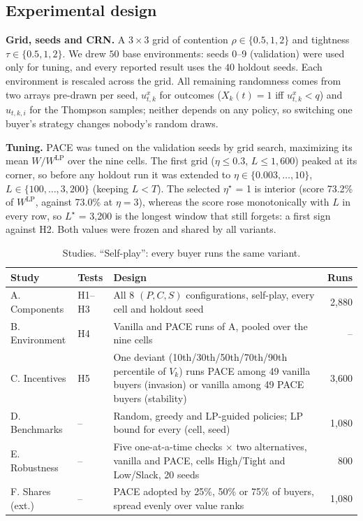 \documentclass{article}
\newcommand{\WLP}{W^{\mathrm{LP}}}
\begin{document}
\subsection{Experimental design}
\label{sec:design}
\textbf{Grid, seeds and CRN.} A $3\times3$ grid of contention $\rho\in\{0.5,1,2\}$ and tightness $\tau\in\{0.5,1,2\}$. We drew $50$ base environments: seeds 0--9 (validation) were used only for tuning, and every reported result uses the $40$ holdout seeds. Each environment is rescaled across the grid. All remaining randomness comes from two arrays pre-drawn per seed, $u^x_{t,k}$ for outcomes ($X_k(t)=1$ iff $u^x_{t,k}<q$) and $u_{t,k,i}$ for the Thompson samples; neither depends on any policy, so switching one buyer's strategy changes nobody's random draws.

\textbf{Tuning.} PACE was tuned on the validation seeds by grid search, maximizing its mean $W/\WLP$ over the nine cells. The first grid ($\eta\le0.3$, $L\le1{,}600$) peaked at its corner, so before any holdout run it was extended to $\eta\in\{0.003,\dots,10\}$, $L\in\{100,\dots,3{,}200\}$ (keeping $L<T$). The selected $\eta^\star$ = 1 is interior (score 73.2\% of $\WLP$, against 73.0\% at $\eta=3$), whereas the score rose monotonically with $L$ in every row, so $L^\star$ = 3,200 is the longest window that still forgets: a first sign against H2. Both values were frozen and shared by all variants.

\begin{table}[h]
\centering\small
\caption{Studies. ``Self-play'': every buyer runs the same variant.}
\label{tab:studies}
\begin{tabular}{@{}l l p{9.6cm} r@{}}
\toprule
\textbf{Study} & \textbf{Tests} & \textbf{Design} & \textbf{Runs}\\
\midrule
A. Components & H1--H3 & All 8 $(P,C,S)$ configurations, self-play, every cell and holdout seed & 2,880\\
B. Environment & H4 & Vanilla and PACE runs of A, pooled over the nine cells & --\\
C. Incentives & H5 & One deviant (10th/30th/50th/70th/90th percentile of $V_k$) runs PACE among 49 vanilla buyers (invasion) or vanilla among 49 PACE buyers (stability) & 3,600\\
D. Benchmarks & -- & Random, greedy and LP-guided policies; LP bound for every (cell, seed) & 1,080\\
E. Robustness & -- & Five one-at-a-time checks $\times$ two alternatives, vanilla and PACE, cells High/Tight and Low/Slack, 20 seeds & 800\\
F. Shares (ext.) & -- & PACE adopted by 25\%, 50\% or 75\% of buyers, spread evenly over value ranks & 1,080\\
\bottomrule
\end{tabular}
\end{table}
\end{document}
